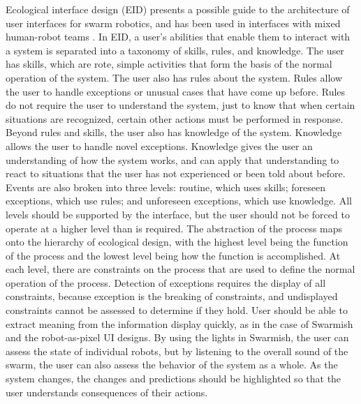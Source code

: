 \documentclass[]{article}
\begin{document}
Ecological interface design (EID) presents a possible guide to the architecture of user interfaces for swarm robotics, and has been used in interfaces with mixed human-robot teams \cite{vicente1992ecological, gancet2010user}. 
In EID, a user's abilities that enable them to interact with a system is separated into a taxonomy of skills, rules, and knowledge. 
The user has skills, which are rote, simple activities that form the basis of the normal operation of the system. 
The user also has rules about the system. 
Rules allow the user to handle exceptions or unusual cases that have come up before. 
Rules do not require the user to understand the system, just to know that when certain situations are recognized, certain other actions must be performed in response. 
Beyond rules and skills, the user also has knowledge of the system. 
Knowledge allows the user to handle novel exceptions. 
Knowledge gives the user an understanding of how the system works, and can apply that understanding to react to situations that the user has not experienced or been told about before. 
Events are also broken into three levels: routine, which uses skills; foreseen exceptions, which use rules; and unforeseen exceptions, which use knowledge. 
All levels should be supported by the interface, but the user should not be forced to operate at a higher level than is required. 
The abstraction of the process maps onto the hierarchy of ecological design, with the highest level being the function of the process and the lowest level being how the function is accomplished. 
At each level, there are constraints on the process that are used to define the normal operation of the process.
Detection of exceptions requires the display of all constraints, because exception is the breaking of constraints, and undisplayed constraints cannot be assessed to determine if they hold.
User should be able to extract meaning from the information display quickly, as in the case of Swarmish and the robot-as-pixel UI designs.
By using the lights in Swarmish, the user can assess the state of individual robots, but by listening to the overall sound of the swarm, the user can also assess the behavior of the system as a whole. 
As the system changes, the changes and predictions should be highlighted so that the user understands consequences of their actions. 
\end{document}

